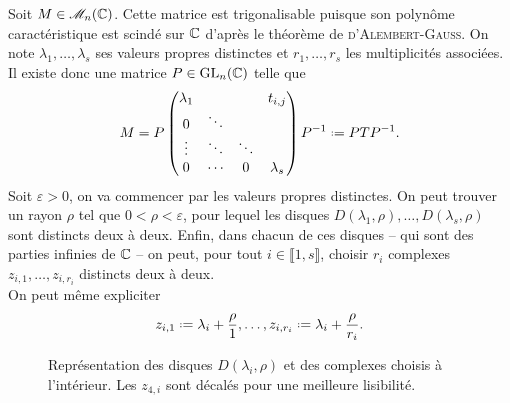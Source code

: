 \begin{preuve}
    Soit $M \in \mathscr{M}_n(\mathbb{C})$. Cette matrice est trigonalisable puisque son polynôme caractéristique est scindé sur $\mathbb{C}$ d'après le théorème de \textsc{d'Alembert}-\textsc{Gauss}. On note $\lambda_1, \dots, \lambda_s$ ses valeurs propres distinctes et $r_1, \dots, r_s$ les multiplicités associées. Il existe donc une matrice $P \in \mathrm{GL}_n(\mathbb{C})$ telle que
    $$
    M = P
    \begin{pmatrix}
        \lambda_1 & & & t_{i,j} \\
        0 & \ddots & & \\
        \vdots & \ddots & \ddots & \\
        0 & \cdots & 0 & \lambda_s
    \end{pmatrix}
    \Inv{P} \defeq P T \Inv{P}.
    $$
    Soit $\varepsilon > 0$, on va commencer par  les valeurs propres distinctes. On peut trouver un rayon $\rho$ tel que $0 < \rho < \varepsilon$, pour lequel les disques $D(\lambda_1, \rho), \dots, D(\lambda_s, \rho)$ sont distincts deux à deux. Enfin, dans chacun de ces disques -- qui sont des parties infinies de $\mathbb{C}$ -- on peut, pour tout $i \in \llbracket 1, s \rrbracket$, choisir $r_i$ complexes $z_{i,1}, \dots, z_{i,r_i}$ distincts deux à deux. \\
    On peut même expliciter
    $$z_{i,1} \defeq \lambda_i + \frac{\rho}{1}, \dots, z_{i, r_i} \defeq \lambda_i + \frac{\rho}{r_i}.$$ 
    
    \begin{figure*}[h!]
        \centering
        
        \caption*{\centering Représentation des disques $D(\lambda_i, \rho)$ et des complexes choisis à l'intérieur. Les $z_{4, i}$ sont décalés pour une meilleure lisibilité.}
    \end{figure*}
    

\end{preuve}
